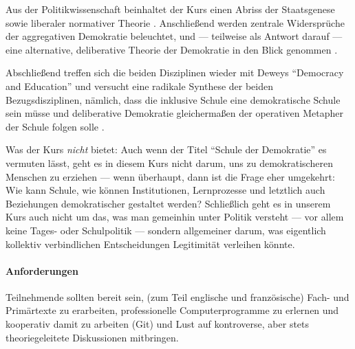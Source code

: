 Aus der Politikwissenschaft beinhaltet der Kurs einen Abriss der Staatsgenese \parencite{Tilly-1985-aa} sowie liberaler normativer Theorie \parencite{Rawls-1971,Dahl-1989-aa}.
Anschließend werden zentrale Widersprüche \parencite{Condorcet1785,Arrow1950} der aggregativen Demokratie beleuchtet, und --- teilweise als Antwort darauf --- eine alternative, deliberative Theorie der Demokratie in den Blick genommen \parencite{Cohen-1989-aa,Habermas1988a}.

Abschließend treffen sich die beiden Disziplinen wieder mit Deweys ``Democracy and Education'' \parencite{Dewey-1916} und versucht eine radikale Synthese der beiden Bezugsdisziplinen, nämlich, dass die inklusive Schule eine demokratische Schule sein müsse \parencite{Feuser2002a} und deliberative Demokratie gleichermaßen der operativen Metapher der Schule folgen solle \parencite{Rosenberg-2002-aa}.

Was der Kurs \emph{nicht} bietet:
Auch wenn der Titel ``Schule der Demokratie'' es vermuten lässt, geht es in diesem Kurs nicht darum, uns zu demokratischeren Menschen zu erziehen --- wenn überhaupt, dann ist die Frage eher umgekehrt:
Wie kann Schule, wie können Institutionen, Lernprozesse und letztlich auch Beziehungen demokratischer gestaltet werden?
Schließlich geht es in unserem Kurs auch nicht um das, was man gemeinhin unter Politik versteht --- vor allem keine Tages- oder Schulpolitik --- sondern allgemeiner darum, was eigentlich kollektiv verbindlichen Entscheidungen Legitimität verleihen könnte.


\paragraph{Anforderungen}

Teilnehmende sollten bereit sein, (zum Teil englische und französische) Fach- und Primärtexte zu erarbeiten, professionelle Computerprogramme zu erlernen und kooperativ damit zu arbeiten (Git) und Lust auf kontroverse, aber stets theoriegeleitete Diskussionen mitbringen.
